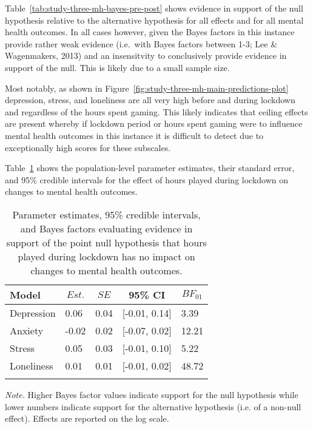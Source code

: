 \documentclass[
  english,
  man,floatsintext]{apa6}
\begin{document}
Table~\ref{tab:study-three-mh-bayes-pre-post} shows evidence in support of the null hypothesis relative to the alternative hypothesis for all effects and for all mental health outcomes. In all cases however, given the Bayes factors in this instance provide rather weak evidence (i.e.~with Bayes factors between 1-3; Lee \& Wagenmakers, 2013) and an insensitvity to conclusively provide evidence in support of the null. This is likely due to a small sample size.

Most notably, as shown in Figure~\ref{fig:study-three-mh-main-predictions-plot} depression, stress, and loneliness are all very high before and during lockdown and regardless of the hours spent gaming. This likely indicates that ceiling effects are present whereby if lockdown period or hours spent gaming were to influence mental health outcomes in this instance it is difficult to detect due to exceptionally high scores for these subscales.

Table~\ref{tab:study-three-mh-bayes-l-diff} shows the population-level parameter estimates, their standard error, and 95\% credible intervals for the effect of hours played during lockdown on changes to mental health outcomes.

\begin{table}[!htbp]

\begin{center}
\begin{threeparttable}

\caption{\label{tab:study-three-mh-bayes-l-diff}Parameter estimates, 95\% credible intervals, and Bayes factors evaluating evidence in support of the point null hypothesis that hours played during lockdown has no impact on changes to mental health outcomes.}

\begin{tabular}{lllll}
\toprule
Model & \multicolumn{1}{c}{$Est.$} & \multicolumn{1}{c}{$SE$} & \multicolumn{1}{c}{95\% CI} & \multicolumn{1}{c}{$BF_{01}$}\\
\midrule
Depression & 0.06 & 0.04 & {}[-0.01, 0.14] & 3.39\\
Anxiety & -0.02 & 0.02 & {}[-0.07, 0.02] & 12.21\\
Stress & 0.05 & 0.03 & {}[-0.01, 0.10] & 5.22\\
Loneliness & 0.01 & 0.01 & {}[-0.01, 0.02] & 48.72\\
\bottomrule
\addlinespace
\end{tabular}

\begin{tablenotes}[para]
\normalsize{\textit{Note.} Higher Bayes factor values indicate support for the null hypothesis while lower numbers indicate support for the alternative hypothesis (i.e. of a non-null effect). Effects are reported on the log scale.}
\end{tablenotes}

\end{threeparttable}
\end{center}

\end{table}
\end{document}
